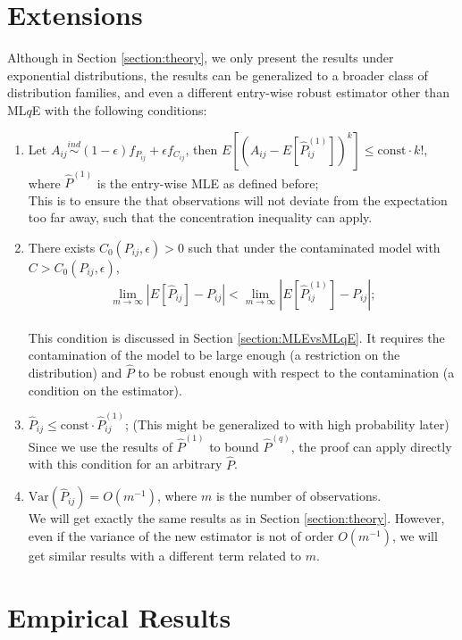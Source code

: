 \documentclass[a4paper]{article}
\renewcommand{\hat}{\widehat}
\begin{document}
\section{Extensions}
\label{section:extension}

Although in Section \ref{section:theory}, we only present the results under exponential distributions, the results can be generalized to a broader class of distribution families, and even a different entry-wise robust estimator other than ML$q$E with the following conditions:
\begin{enumerate}
\item Let $A_{ij} \stackrel{ind}{\sim} (1-\epsilon) f_{P_{ij}} + \epsilon f_{C_{ij}}$, then $E[(A_{ij} - E[\hat{P}_{ij}^{(1)}])^k] \le \mathrm{const} \cdot k!$, where $\hat{P}^{(1)}$ is the entry-wise MLE as defined before;\\
This is to ensure the that observations will not deviate from the expectation too far away, such that the concentration inequality can apply.
\item There exists $C_0(P_{ij}, \epsilon) > 0$ such that under the contaminated model with $C > C_0(P_{ij}, \epsilon)$,
\[
	\lim_{m \to \infty} \left| E[\hat{P}_{ij}] - P_{ij} \right| < 
    \lim_{m \to \infty} \left| E[\hat{P}^{(1)}_{ij}] - P_{ij} \right|;
\]\\
This condition is discussed in Section \ref{section:MLEvsMLqE}. It requires the contamination of the model to be large enough (a restriction on the distribution) and $\hat{P}$ to be robust enough with respect to the contamination (a condition on the estimator).
\item $\hat{P}_{ij} \le \mathrm{const} \cdot \hat{P}_{ij}^{(1)}$; (This might be generalized to with high probability later)\\
Since we use the results of $\hat{P}^{(1)}$ to bound $\hat{P}^{(q)}$, the proof can apply directly with this condition for an arbitrary $\hat{P}$.
\item $\mathrm{Var}(\hat{P}_{ij}) = O(m^{-1})$, where $m$ is the number of observations.\\
We will get exactly the same results as in Section \ref{section:theory}. However, even if the variance of the new estimator is not of order $O(m^{-1})$, we will get similar results with a different term related to $m$.
\end{enumerate}


\section{Empirical Results}
\end{document}
